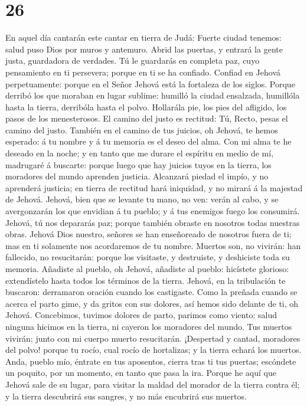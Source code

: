 \hypertarget{section-25}{%
\section{26}\label{section-25}}

 En aquel día cantarán este cantar en tierra de Judá: Fuerte
ciudad tenemos: salud puso Dios por muros y antemuro.  Abrid
las puertas, y entrará la gente justa, guardadora de verdades.
 Tú le guardarás en completa paz, cuyo pensamiento en ti
persevera; porque en ti se ha confiado.  Confiad en Jehová
perpetuamente: porque en el Señor Jehová está la fortaleza de los
siglos.  Porque derribó los que moraban en lugar sublime:
humilló la ciudad ensalzada, humillóla hasta la tierra, derribóla hasta
el polvo.  Hollarála pie, los pies del afligido, los pasos
de los menesterosos.  El camino del justo es rectitud: Tú,
Recto, pesas el camino del justo.  También en el camino de
tus juicios, oh Jehová, te hemos esperado: á tu nombre y á tu memoria es
el deseo del alma.  Con mi alma te he deseado en la noche; y
en tanto que me durare el espíritu en medio de mí, madrugaré á buscarte:
porque luego que hay juicios tuyos en la tierra, los moradores del mundo
aprenden justicia.  Alcanzará piedad el impío, y no
aprenderá justicia; en tierra de rectitud hará iniquidad, y no mirará á
la majestad de Jehová.  Jehová, bien que se levante tu
mano, no ven: verán al cabo, y se avergonzarán los que envidian á tu
pueblo; y á tus enemigos fuego los consumirá.  Jehová, tú
nos depararás paz; porque también obraste en nosotros todas nuestras
obras.  Jehová Dios nuestro, señores se han enseñoreado de
nosotros fuera de ti; mas en ti solamente nos acordaremos de tu nombre.
 Muertos son, no vivirán: han fallecido, no resucitarán:
porque los visitaste, y destruiste, y deshiciste toda su memoria.
 Añadiste al pueblo, oh Jehová, añadiste al pueblo:
hicístete glorioso: extendístelo hasta todos los términos de la tierra.
 Jehová, en la tribulación te buscaron: derramaron oración
cuando los castigaste.  Como la preñada cuando se acerca el
parto gime, y da gritos con sus dolores, así hemos sido delante de ti,
oh Jehová.  Concebimos, tuvimos dolores de parto, parimos
como viento: salud ninguna hicimos en la tierra, ni cayeron los
moradores del mundo.  Tus muertos vivirán; junto con mi
cuerpo muerto resucitarán. ¡Despertad y cantad, moradores del polvo!
porque tu rocío, cual rocío de hortalizas; y la tierra echará los
muertos.  Anda, pueblo mío, éntrate en tus aposentos,
cierra tras ti tus puertas; escóndete un poquito, por un momento, en
tanto que pasa la ira.  Porque he aquí que Jehová sale de
su lugar, para visitar la maldad del morador de la tierra contra él; y
la tierra descubrirá sus sangres, y no más encubrirá sus muertos.

